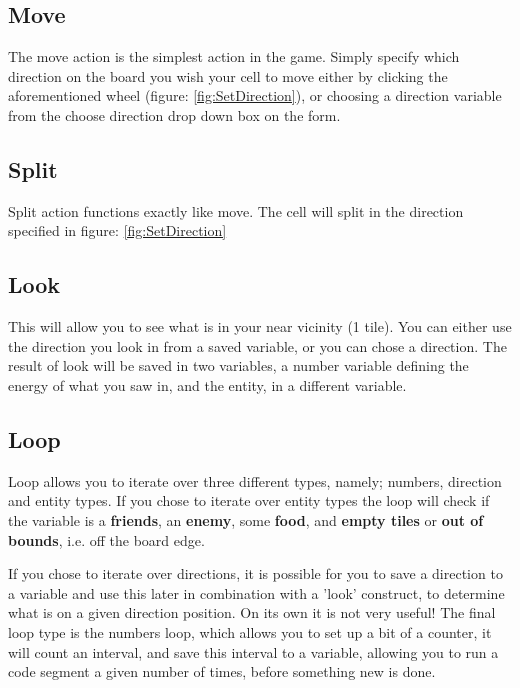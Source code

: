 \subsection*{Move}

The move action is the simplest action in the game. Simply specify which direction on the board you wish your cell to move either by clicking the aforementioned wheel (figure: \ref{fig:SetDirection}), or choosing a direction variable from the choose direction drop down box on the form.

\subsection*{Split}

Split action functions exactly like move. The cell will split in the direction specified in figure: \ref{fig:SetDirection}

\subsection*{Look}

This will allow you to see what is in your near vicinity (1 tile). You can either use the direction you look in from a saved variable, or you can chose a direction. The result of look will be saved in two variables, a number variable defining the energy of what you saw in, and the entity, in a different variable.

\subsection*{Loop}

Loop allows you to iterate over three different types, namely; numbers, direction and entity types. If you chose to iterate over entity types the loop will check if the variable is a \textbf{friends}, an \textbf{enemy}, some \textbf{food}, and \textbf{empty tiles} or \textbf{out of bounds}, i.e. off the board edge.


If you chose to iterate over directions, it is possible for you to save a direction to a variable and use this later in combination with a 'look' construct, to determine what is on a given direction position. On its own it is not very useful! The final loop type is the numbers loop, which allows you to set up a bit of a counter, it will count an interval, and save this interval to a variable, allowing you to run a code segment a given number of times, before something new is done.

